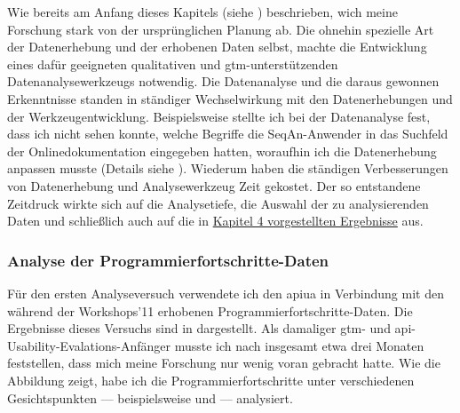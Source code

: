 Wie bereits am Anfang dieses Kapitels (siehe ) beschrieben, wich meine Forschung stark von der ursprünglichen Planung ab. Die ohnehin spezielle Art der Datenerhebung und der erhobenen Daten selbst, machte die Entwicklung eines dafür geeigneten qualitativen und \gls{gtm}-unterstützenden Datenanalysewerkzeugs notwendig. Die Datenanalyse und die daraus gewonnen Erkenntnisse standen in ständiger Wechselwirkung mit den Datenerhebungen und der Werkzeugentwicklung. Beispielsweise stellte ich bei der Datenanalyse fest, dass ich nicht sehen konnte, welche Begriffe die SeqAn-Anwender in das Suchfeld der Onlinedokumentation eingegeben hatten, woraufhin ich die Datenerhebung anpassen musste (Details siehe ). Wiederum haben die ständigen Verbesserungen von Datenerhebung und Analysewerkzeug Zeit gekostet. Der so entstandene Zeitdruck wirkte sich auf die Analysetiefe, die Auswahl der zu analysierenden Daten und schließlich auch auf die in \hyperref[sec:Ergebnisse]{Kapitel 4 vorgestellten Ergebnisse} aus.

\subsubsection{Analyse der Programmierfortschritte-Daten}

Für den ersten Analyseversuch verwendete ich den \acrfull{apiua} in Verbindung mit den während der Workshops'11 erhobenen Programmierfortschritte-Daten. Die Ergebnisse dieses Versuchs sind in  dargestellt. Als damaliger \gls{gtm}- und \acrshort{api}-Usability-Evalations-Anfänger musste ich nach insgesamt etwa drei Monaten feststellen, dass mich meine Forschung nur wenig voran gebracht hatte. Wie die Abbildung zeigt, habe ich die Programmierfortschritte unter verschiedenen Gesichtspunkten --- beispielsweise  und  --- analysiert.

